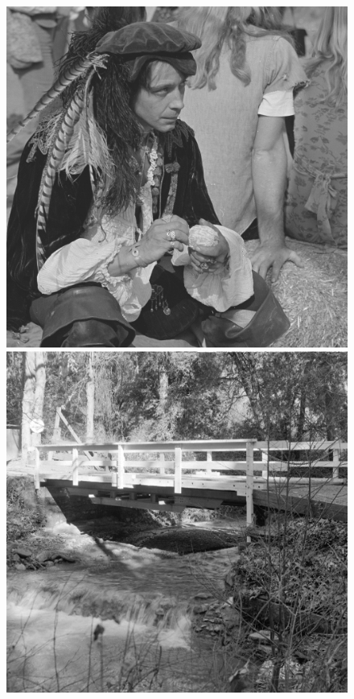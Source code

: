 \begin{figure}[h!]
    \includegraphics[width=\size]{fig/testimages/pirate.png}\hfill
    \includegraphics[width=\size]{fig/testimages/walkbridge.png}\hfill

\end{figure}
